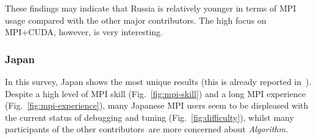 \documentclass[preprint,5p,times]{elsarticle}
\def\myquote#1{{\it #1}}
\def\countries{contributors\xspace{}}%
\def\mcountries{major contributors\xspace{}}%
\begin{document}
These findings may indicate that Russia is relatively younger in terms
of MPI usage compared with the other \mcountries. The high focus on
MPI+CUDA, however, is very interesting.

\subsubsection*{Japan}

In this survey, Japan shows the most unique results (this is already reported
in~\cite{swopp2019}). Despite a high level of MPI skill
(Fig.~\ref{fig:mpi-skill}) and a long MPI experience
(Fig.~\ref{fig:mpi-experience}), many Japanese MPI users seem to be displeased
with the current status of debugging and tuning (Fig.~\ref{fig:difficulty}),
whilst many participants of the other \countries\ are more concerned about
\myquote{Algorithm}.
\end{document}
